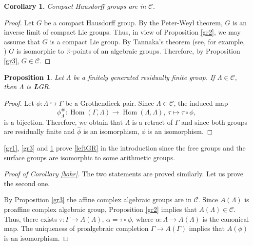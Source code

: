 \documentclass{amsart}
\newtheorem{pro}[lem]{Proposition}
\newtheorem{cor}[lem]{Corollary}
\theoremstyle{definition}
\theoremstyle{remark}
\DeclareMathOperator{\Hom}{Hom}
\newcommand{\R}{\mathbb{R}}
\begin{document}
\begin{cor}\label{gr4}
Compact Hausdorff groups are in $\mathcal C$.
\end{cor}
\begin{proof} Let $G$ be a compact Hausdorff group. By the Peter-Weyl theorem, $G$ is an inverse limit of compact Lie groups. Thus, in view of Proposition \ref{gr2}, we may assume that $G$ is a compact Lie group.  By Tannaka's theorem (see, for example, \cite{Canotes}) $G$ is isomorphic to $\R$-points of an algebraic groups. Therefore, by Proposition \ref{gr3}, $G\in \mathcal C$.
\end{proof}
\begin{pro}\label{gr5}
 Let $\Lambda$ be a  finitely generated residually finite group. If $\Lambda \in \mathcal C$, then $\Lambda$ is {\textbf L}GR.
\end{pro}
\begin{proof} Let  $\phi:\Lambda\hookrightarrow \Gamma$ be a Grothendieck pair.
Since $\Lambda \in \mathcal C$, the induced map 
$$\phi^{\#}_{\Lambda}: \Hom (\Gamma, \Lambda)\to \Hom (\Lambda, \Lambda), \ \tau\mapsto \tau\circ \phi,$$  is a bijection. Therefore, we obtain that $\Lambda$ is a retract of $\Gamma$ and since both groups are residually finite and $\widehat \phi$ is an isomorphism, $\phi$ is an isomorphism.
\end{proof}
 \cref{gr1}, \cref{gr3} and \cref{gr5} prove    \cref{leftGR} in the introduction since the free groups and the surface groups are isomorphic to some arithmetic groups.
\begin{proof}[Proof of Corollary \ref{bohr}]
The two  statements are proved similarly. Let us prove the second one. 

By Proposition \ref{gr3}  the affine complex algebraic  groups are in $\mathcal C$. Since $A(\Lambda)$ is proaffine complex algebraic  group, Proposition \ref{gr2} implies that $A(\Lambda)\in \mathcal C$. Thus, there exists $\tau:\Gamma\to A(\Lambda)$, $\alpha=\tau\circ \phi$, where $\alpha:\Lambda \to A(\Lambda)$ is the canonical map. The uniqueness of proalgebraic completion $\Gamma\to A(\Gamma)$ implies that $A(\phi)$ is an isomorphism.
\end{proof} 
  
  
\end{document}
